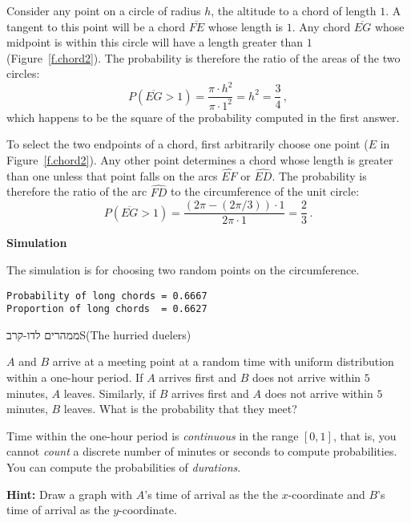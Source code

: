 Consider any point on a circle of radius $h$, the altitude to a chord of length $1$. A tangent to this point will be a chord $\overline{FE}$ whose length is $1$. Any chord $\overline{EG}$ whose midpoint is within this circle will have a length greater than $1$ (Figure~\ref{f.chord2}). The probability is therefore the ratio of the areas of the two circles:
\[
P(\overline{EG}>1)=\frac{\pi \cdot h^2}{\pi \cdot 1^2}=h^2=\frac{3}{4}\,,
\]
which happens to be the square of the probability computed in the first answer.

To select the two endpoints of a chord, first arbitrarily choose one point ($E$ in Figure~\ref{f.chord2}). Any other point determines a chord whose length is greater than one unless that point falls on the arcs $\widehat{EF}$ or $\widehat{ED}$. The probability is therefore the ratio of the arc $\widehat{FD}$ to the circumference of the unit circle:
\[
P(\overline{EG}>1)=\frac{(2\pi-(2\pi/3))\cdot 1}{2\pi \cdot 1}=\frac{2}{3}\,.
\]

\textbf{Simulation}

The simulation is for choosing two random points on the circumference.
\begin{verbatim}
Probability of long chords = 0.6667
Proportion of long chords  = 0.6627
\end{verbatim}


\begin{prob}{ממהרים לדו-קרב}{S}{(The hurried duelers)}

$A$ and $B$ arrive at a meeting point at a random time with uniform distribution within a one-hour period.
If $A$ arrives first and $B$ does not arrive within $5$ minutes, $A$ leaves. 
Similarly, if $B$ arrives first and $A$ does not arrive within $5$ minutes, $B$ leaves. What is the probability that they meet?

Time within the one-hour period is \emph{continuous} in the range $[0,1]$, that is, you cannot \emph{count} a discrete number of minutes or seconds to compute probabilities. You can compute the probabilities of \emph{durations}.

\textbf{Hint:} Draw a graph with $A$'s time of arrival as the the $x$-coordinate and $B$'s time of arrival as the $y$-coordinate.
\end{prob}

\solution{}

